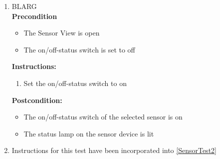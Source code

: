 \documentclass[a4paper]{article}
\newlength{\testlabellength}
\newenvironment{testlist}{\begin{enumerate}[label=\bfseries Instruction \thesubsection.\arabic* , labelindent=0pt, labelwidth=\testlabellength , leftmargin=2cm]}{\end{enumerate}}
\newenvironment{precondition}{
{\color{white}BLARG}\\ 
\textbf{Precondition}
\begin{itemize}[labelindent=0cm, labelwidth=2cm , leftmargin=1cm]
}
{\end{itemize}}
\newenvironment{instruction}{
\textbf{Instructions:}
\begin{enumerate}[label=\bfseries  \arabic*., labelindent=0cm, labelwidth=2cm , leftmargin=1cm]
}
{\end{enumerate}}
\newenvironment{postcondition}{
\textbf{Postcondition:}
\begin{itemize}[labelindent=0cm, labelwidth=2cm , leftmargin=1cm]
}
{\end{itemize}}
\begin{document}
\begin{appendices}
\begin{testlist}

	\item
		\begin{precondition}
			\item The Sensor View is open
			\item The on/off-status switch is set to off
		\end{precondition}
		\begin{instruction}
			\item Set the on/off-status switch to on
	  	\end{instruction}
	  	\begin{postcondition}
	  		\item The on/off-status switch of the selected sensor is on
	  		\item The status lamp on the sensor device is lit
	  	\end{postcondition}

	\item
		Instructions for this test have been incorporated into \ref{SensorTest2}



\end{testlist}
\end{appendices}
\end{document}
